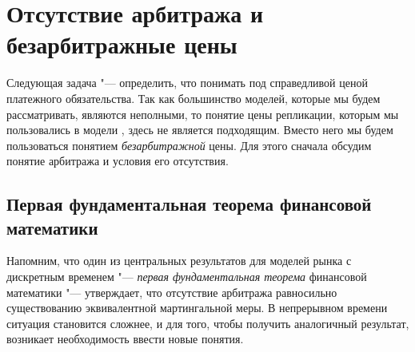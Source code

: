 

\section{Отсутствие арбитража и безарбитражные цены}

Следующая задача "--- определить, что понимать под справедливой ценой платежного обязательства.
Так как большинство моделей, которые мы будем рассматривать, являются неполными, то понятие цены репликации, которым мы пользовались в модели \bs, здесь не является подходящим. 
Вместо него мы будем пользоваться понятием \emph{безарбитражной} цены.
Для этого сначала обсудим понятие арбитража и условия его отсутствия.


\subsection{Первая фундаментальная теорема финансовой математики}

Напомним, что один из центральных результатов для моделей рынка с дискретным временем "--- \emph{первая фундаментальная теорема} финансовой математики "--- утверждает, что  отсутствие арбитража равносильно существованию эквивалентной мартингальной меры.
В непрерывном времени ситуация становится сложнее, и для того, чтобы получить аналогичный результат, возникает необходимость ввести новые понятия.


